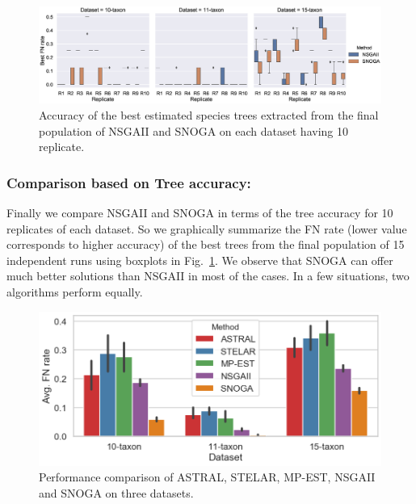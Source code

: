 \begin{figure}
	\centering
	\begin{adjustwidth}{-4cm}{-2cm}
		\includegraphics[width=1.7\textwidth]{Figure/emo_boxplot}
		\end{adjustwidth}
		\caption{Accuracy of the best estimated species trees extracted from the final population of NSGAII and SNOGA on each dataset having 10 replicate.} \label{fig:emo_compare}

\end{figure}

\subsubsection{Comparison based on Tree accuracy:} Finally we compare NSGAII and SNOGA in terms of the tree accuracy for 10 replicates of each dataset. So we graphically summarize the FN rate (lower value corresponds to higher accuracy) of the best trees from the final population of 15 independent runs using boxplots in Fig.~\ref{fig:emo_compare}. We observe that SNOGA can offer much better solutions than NSGAII in most of the cases. In a few situations, two algorithms perform equally.

\begin{figure}
	\begin{adjustwidth}{0cm}{0cm}
		\centering
		\includegraphics[width=1.0\textwidth]{Figure/all_dataset_compare}
		\caption{Performance comparison of ASTRAL, STELAR, MP-EST, NSGAII and SNOGA on three datasets. 
		} \label{fig:compare_exisitng_methods}
	\end{adjustwidth}
\end{figure}


